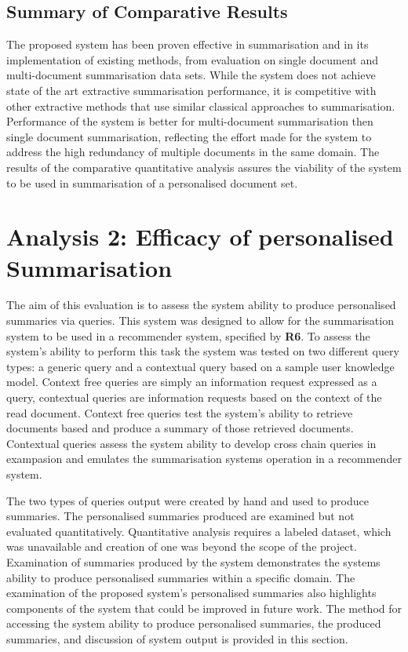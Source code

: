 \subsection{Summary of Comparative Results}
The proposed system has been proven effective in summarisation and in its implementation of existing methods, from evaluation on single document and multi-document summarisation data sets. While the system does not achieve state of the art extractive summarisation performance, it is competitive with other extractive methods that use similar classical approaches to summarisation. Performance of the system is better for multi-document summarisation then single document summarisation, reflecting the effort made for the system to address the high redundancy of multiple documents in the same domain. The results of the comparative quantitative analysis assures the viability of the system to be used in summarisation of a personalised document set.

\section{Analysis 2: Efficacy of personalised Summarisation}
The aim of this evaluation is to assess the system ability to produce personalised summaries via queries. This system was designed to allow for the summarisation system to be used in a recommender system, specified by \textbf{R6}. To assess the system's ability to perform this task the system was tested on two different query types: a generic query and a contextual query based on a sample user knowledge model. Context free queries are simply an information request expressed as a query, contextual queries are information requests based on the context of the read document. Context free queries test the system's ability to retrieve documents based and produce a summary of those retrieved documents. Contextual queries assess the system ability to develop cross chain queries in exampasion and emulates the summarisation systems operation in a recommender system.

The two types of queries output were created by hand and used to produce summaries. The personalised summaries produced are examined but not evaluated quantitatively. Quantitative analysis requires a labeled dataset, which was unavailable and creation of one was beyond the scope of the project. Examination of summaries produced by the system demonstrates the systems ability to produce personalised summaries within a specific domain. The examination of the proposed system’s personalised summaries also highlights components of the system that could be improved in future work. The method for accessing the system ability to produce personalised summaries, the produced summaries, and discussion of system output is provided in this section.

